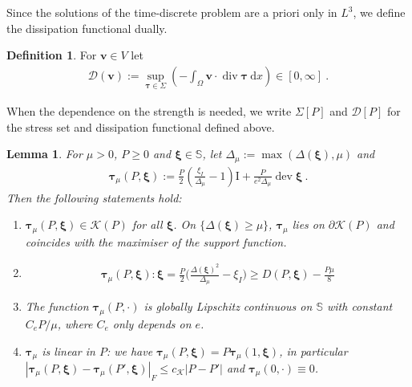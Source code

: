 \documentclass{article}
\newtheorem{lemma}[theorem]{Lemma}
\theoremstyle{definition}
\newtheorem{definition}{Definition}[section]
\newcommand{\bfv}{\boldsymbol{v}}
\newcommand{\bftau}{\boldsymbol{\tau}}
\newcommand{\bfxi}{\boldsymbol{\xi}}
\newcommand{\bfI}{\boldsymbol{\mathrm{I}}}
\newcommand{\K}{\mathcal{K}}
\newcommand{\D}{\mathcal{D}}
\newcommand{\dd}{\:\mathrm{d}}
\renewcommand\div{\operatorname{\mathrm{div}}}
\DeclareMathOperator{\dev}{dev}
\begin{document}
Since the solutions of the time-discrete problem are a priori only in $L^3$, we
define the dissipation functional dually.
\begin{definition}\label{def:D}
    For $\bfv \in V$ let
    \begin{align}
        \D(\bfv) := \sup_{\bftau\in \Sigma} \left(- \int_\Omega \bfv \cdot \div \bftau \dd x \right) \in [0, \infty] \ .
        \label{eq:def_diss}
    \end{align}
\end{definition}
When the dependence on the strength is needed, we write $\Sigma[P]$ and
$\D[P]$ for the stress set and dissipation functional defined above.
\begin{lemma}\label{lem:hubler}
    For $\mu >0$, $P\geq 0$ and $\bfxi \in \mathbb S$, let $\Delta_\mu := \max (\Delta(\bfxi),\mu)$ and
    \begin{align*}
        \bftau_\mu (P,\bfxi) := \frac{P}{2} \left(\frac{\xi_I}{\Delta_\mu}-1\right) \bfI + \frac{P}{e^2\Delta_\mu}\dev\bfxi \ .
    \end{align*}
    Then the following statements hold:
    \begin{enumerate}
        \item $\bftau_\mu(P,\bfxi) \in \K(P)$ for all $\bfxi$. On $\{ \Delta (\bfxi)\geq \mu\}$,
        $\bftau_\mu$ lies on $\partial\K(P)$ and coincides with the
        maximiser of the support function.
        \item
        \begin{align}
            \bftau_\mu (P, \bfxi) : \bfxi = \frac{P}{2}\Big(\frac{\Delta(\bfxi)^2}{\Delta_\mu} - \xi_I \Big) \geq D(P, \bfxi) - \frac{P\mu}{8}
            \label{eq:hubler}
        \end{align}
        \item The function $\bftau_\mu(P,\cdot)$ is globally Lipschitz continuous on $\mathbb S$ with constant $C_e P/\mu$, where $C_e$ only depends on $e$.
        \item $\bftau_\mu$ is linear in $P$: we have $\bftau_\mu(P,\bfxi) = P\bftau_\mu (1,\bfxi)$, in particular $|\bftau_\mu(P, \bfxi)- \bftau_\mu(P',\bfxi)|_F \leq c_\K |P-P'|$ and $\bftau_\mu(0,\cdot) \equiv 0$.
    \end{enumerate}
\end{lemma}
\end{document}
